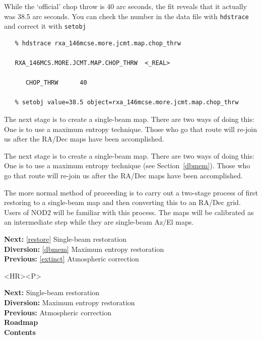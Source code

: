\documentclass[11pt]{article}
\newenvironment{latexonly}{}{}
\newcommand{\htmlref}[2]{#1}
\newcommand{\xref}[3]{#1}
\begin{document}
   While the `official' chop throw is 40 arc seconds, the fit reveals that
   it actually was 38.5 arc seconds.
   You can check the number in the data file with
{\tt \xref{hdstrace}{sun102}{}}
   and correct it with
{\tt \xref{setobj}{sun86}{SETOBJ}}

\begin{verbatim}
   % hdstrace rxa_146mcse.more.jcmt.map.chop_thrw

   RXA_146MCS.MORE.JCMT.MAP.CHOP_THRW  <_REAL>

      CHOP_THRW      40

   % setobj value=38.5 object=rxa_146mcse.more.jcmt.map.chop_thrw
\end{verbatim}

\begin{htmlonly}
   The next stage is to create a
\htmlref{single-beam map.}{glossdualbeam}
   There are two ways of doing this: One is to use a
\htmlref{maximum entropy technique.}{dbmem}
   Those who go that route will re-join us
   after the RA/Dec maps have been accomplished.
\end{htmlonly}
\begin{latexonly}
   The next stage is to create a
\htmlref{single-beam map.}{glossdualbeam}
   There are two ways of doing this: One is to use a
   maximum entropy technique
(see Section~\ref{dbmem}).
   Those who go that route will re-join us
   after the RA/Dec maps have been accomplished.
\end{latexonly}

   The more normal method of proceeding
   is to carry out a two-stage process of first restoring to a single-beam map
   and then converting this to an RA/Dec grid. Users of
\htmlref{NOD2}{glossnod2}
   will be familiar with this process. The maps will be calibrated as an
   intermediate step while they are single-beam Az/El maps.

\begin{latexonly}
{\bf Next:} \ref{restore} Single-beam restoration\\
{\bf Diversion:} \ref{dbmem} Maximum entropy restoration\\
{\bf Previous:} \ref{extinct} Atmospheric correction\\
\end{latexonly}

\begin{htmlonly}
\begin{rawhtml} <HR><P> \end{rawhtml}
{\bf \htmlref{Next:}{restore}} Single-beam restoration\\
{\bf \htmlref{Diversion:}{dbmem}} Maximum entropy restoration\\
{\bf \htmlref{Previous:}{extinct}} Atmospheric correction\\
{\bf \htmlref{Roadmap}{roadmap}}\\
{\bf \htmlref{Contents}{stardoccontents}}\\
\end{htmlonly}
\end{document}
